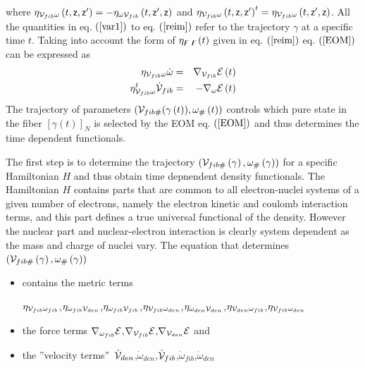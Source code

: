 where $\eta _{{\cal V}_{fib}\omega }\left( t,{\sf z},{\sf z}^{\prime
}\right) =-\eta _{\omega {\cal V}_{fib}}\left( t,{\sf z}^{\prime },{\sf z}%
\right) $ and $\eta _{{\cal V}_{fib}\omega }\left( t,{\sf z},{\sf z}^{\prime
}\right) ^{t}=\eta _{{\cal V}_{fib}\omega }\left( t,{\sf z}^{\prime },{\sf z}%
\right) $. All the quantities in eq. $\left( \ref{var1}\right) $ to eq. $%
\left( \ref{reim}\right) $ refer to the trajectory $\gamma $ at a specific
time $t$. Taking into account the form of $\eta _{{\bf \digamma \,\digamma }%
}(t)$ given in eq. $\left( \ref{reim}\right) $ eq. $\left( \ref{EOM}\right) $
can be expressed as 
\begin{eqnarray}
\eta _{{\cal V}_{fib}\omega }\dot{\omega} &=&\nabla _{{\cal V}_{fib}}{\cal E}%
\left( t\right) \\
\eta _{{\cal V}_{fib}\omega }^{t}{\cal \dot{V}}_{fib} &=&-\nabla _{{\cal %
\omega }}{\cal E}\left( t\right)
\end{eqnarray}%
The trajectory of parameters $\left( {\cal V}_{fib\#}(\gamma \left( t\right)
),\omega _{\#}\left( t\right) \right) $ controls which pure state in the
fiber $\left[ \gamma \left( t\right) \right] _{N}$ is selected by the EOM
eq. $\left( \ref{EOM}\right) $ and thus determines the time dependent
functionals.

The first step is to determine the trajectory $\left( {\cal V}_{fib\#}\left(
\gamma \right) ,\omega _{\#}\left( \gamma \right) \right) $ for a specific
Hamiltonian $H$ and thus obtain time depnendent density functionals. The
Hamiltonian $H$ contains parts that are common to all electron-nuclei
systems of a given number of electrons, namely the electron kinetic and
coulomb interaction terms, and this part defines a true universal functional
of the density. However the nuclear part and nuclear-electron interaction is
clearly system dependent as the mass and charge of nuclei vary. The equation
that determines $\left( {\cal V}_{fib\#}\left( \gamma \right) ,\omega
_{\#}\left( \gamma \right) \right) $

\begin{itemize}
\item contains the metric terms

$\eta _{{\cal V}_{fib}\omega _{fib}}$,$\eta _{{\cal \omega }_{fib}{\cal V}%
_{den}}$,$\eta _{\omega _{fib}{\cal V}_{fib}}$,$\eta _{{\cal V}_{fib}{\cal %
\omega }_{den}}$,$\eta _{\omega _{den}{\cal V}_{den}}$,$\eta _{{\cal V}%
_{den}\omega _{fib}}$,$\eta _{{\cal V}_{fib}\omega _{den}}$

\item the force terms $\nabla _{\omega _{fib}}{\cal E}$,$\nabla _{{\cal V}%
_{fib}}{\cal E}$,$\nabla _{{\cal V}_{den}}{\cal E}$ and

\item the \textquotedblright velocity terms\textquotedblright\ ${\cal \dot{V}%
}_{den}$,$\dot{\omega}_{den}$,${\cal \dot{V}}_{fib}$,$\dot{\omega}_{fib}$,$%
\dot{\omega}_{den}$
\end{itemize}

